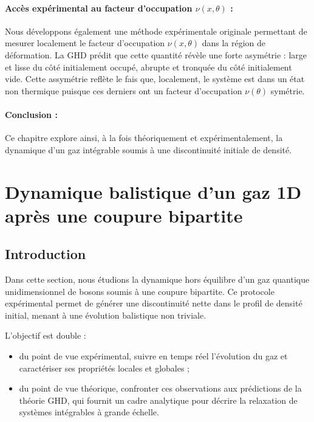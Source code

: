 \paragraph{Accès expérimental au facteur d’occupation $\nu(x,\theta)$ :}
Nous développons également une méthode expérimentale originale permettant de mesurer localement le facteur d’occupation $\nu(x,\theta)$ dans la région de déformation. La \gls*{GHD} prédit que cette quantité révèle une forte asymétrie : large et lisse du côté initialement occupé, abrupte et tronquée du côté initialement vide. Cette assymétrie reflète le fais que, localement, le système est dans un état non thermique puisque ces derniers ont un facteur d'occupation $\nu(\theta)$ symétrie.%

\paragraph{Conclusion :}
Ce chapitre explore ainsi, à la fois théoriquement et expérimentalement, la dynamique d’un gaz intégrable soumis à une discontinuité initiale de densité. %


\section{Dynamique balistique d’un gaz 1D après une coupure bipartite}

\subsection*{Introduction}

Dans cette section, nous étudions la dynamique hors équilibre d’un gaz quantique unidimensionnel de bosons soumis à une coupure bipartite. Ce protocole expérimental permet de générer une discontinuité nette dans le profil de densité initial, menant à une évolution balistique non triviale.

L’objectif est double :

\begin{itemize}[label = $\bullet$]
	\item du point de vue expérimental, suivre en temps réel l’évolution du gaz et caractériser ses propriétés locales et globales ;
	\item du point de vue théorique, confronter ces observations aux prédictions de la théorie \gls*{GHD}, qui fournit un cadre analytique pour décrire la relaxation de systèmes intégrables à grande échelle.
\end{itemize}

